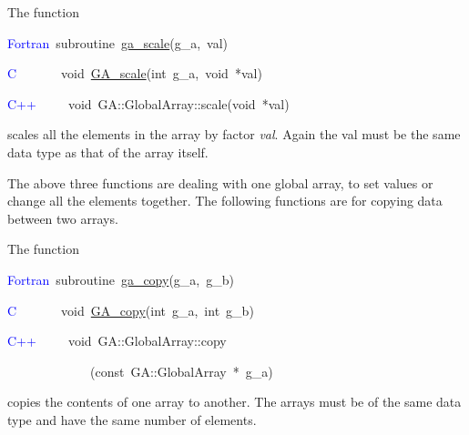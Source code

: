 The function
\begin{lyxcode}
\textcolor{blue}{Fortran}~subroutine~\href{http://www.emsl.pnl.gov/docs/global/ga_ops.html\#ga_scale}{ga\_{}scale}(g\_a,~val)~

\textcolor{blue}{C}~~~~~~~void~\href{http://www.emsl.pnl.gov/docs/global/c_nga_ops.html\#ga_scale}{GA\_{}scale}(int~g\_a,~void~{*}val)~

\textcolor{blue}{C++}~~~~~void~GA::GlobalArray::scale(void~{*}val)
\end{lyxcode}
scales all the elements in the array by factor \emph{val}. Again the
val must be the same data type as that of the array itself.

The above three functions are dealing with one global array, to set
values or change all the elements together. The following functions
are for copying data between two arrays.

The function
\begin{lyxcode}
\textcolor{blue}{Fortran}~subroutine~\href{http://www.emsl.pnl.gov/docs/global/ga_ops.html\#ga_copy}{ga\_{}copy}(g\_a,~g\_b)~

\textcolor{blue}{C}~~~~~~~void~\href{http://www.emsl.pnl.gov/docs/global/c_nga_ops.html\#ga_copy}{GA\_{}copy}(int~g\_a,~int~g\_b)~

\textcolor{blue}{C++}~~~~~void~GA::GlobalArray::copy

~~~~~~~~~~~~~(const~GA::GlobalArray~{*}~g\_a)
\end{lyxcode}
copies the contents of one array to another. The arrays must be of
the same data type and have the same number of elements.

